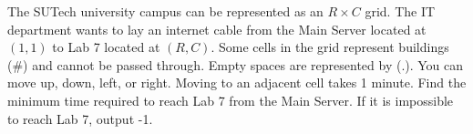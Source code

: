 The SUTech university campus can be represented as an $R \times C$ grid. The IT department wants to lay an internet cable from the Main Server located at $(1, 1)$ to Lab 7 located at $(R, C)$.
Some cells in the grid represent buildings (#) and cannot be passed through. Empty spaces are represented by (.).
You can move up, down, left, or right. Moving to an adjacent cell takes 1 minute.
Find the minimum time required to reach Lab 7 from the Main Server. If it is impossible to reach Lab 7, output -1.